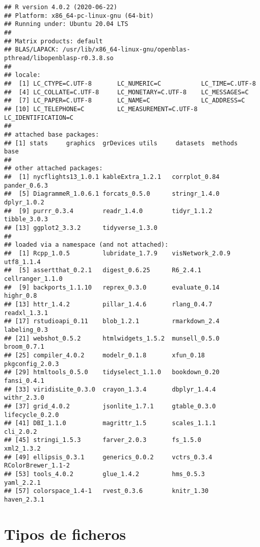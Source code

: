 \documentclass[
]{book}
\begin{document}
\begin{verbatim}
## R version 4.0.2 (2020-06-22)
## Platform: x86_64-pc-linux-gnu (64-bit)
## Running under: Ubuntu 20.04 LTS
## 
## Matrix products: default
## BLAS/LAPACK: /usr/lib/x86_64-linux-gnu/openblas-pthread/libopenblasp-r0.3.8.so
## 
## locale:
##  [1] LC_CTYPE=C.UTF-8       LC_NUMERIC=C           LC_TIME=C.UTF-8       
##  [4] LC_COLLATE=C.UTF-8     LC_MONETARY=C.UTF-8    LC_MESSAGES=C         
##  [7] LC_PAPER=C.UTF-8       LC_NAME=C              LC_ADDRESS=C          
## [10] LC_TELEPHONE=C         LC_MEASUREMENT=C.UTF-8 LC_IDENTIFICATION=C   
## 
## attached base packages:
## [1] stats     graphics  grDevices utils     datasets  methods   base     
## 
## other attached packages:
##  [1] nycflights13_1.0.1 kableExtra_1.2.1   corrplot_0.84      pander_0.6.3      
##  [5] DiagrammeR_1.0.6.1 forcats_0.5.0      stringr_1.4.0      dplyr_1.0.2       
##  [9] purrr_0.3.4        readr_1.4.0        tidyr_1.1.2        tibble_3.0.3      
## [13] ggplot2_3.3.2      tidyverse_1.3.0   
## 
## loaded via a namespace (and not attached):
##  [1] Rcpp_1.0.5         lubridate_1.7.9    visNetwork_2.0.9   utf8_1.1.4        
##  [5] assertthat_0.2.1   digest_0.6.25      R6_2.4.1           cellranger_1.1.0  
##  [9] backports_1.1.10   reprex_0.3.0       evaluate_0.14      highr_0.8         
## [13] httr_1.4.2         pillar_1.4.6       rlang_0.4.7        readxl_1.3.1      
## [17] rstudioapi_0.11    blob_1.2.1         rmarkdown_2.4      labeling_0.3      
## [21] webshot_0.5.2      htmlwidgets_1.5.2  munsell_0.5.0      broom_0.7.1       
## [25] compiler_4.0.2     modelr_0.1.8       xfun_0.18          pkgconfig_2.0.3   
## [29] htmltools_0.5.0    tidyselect_1.1.0   bookdown_0.20      fansi_0.4.1       
## [33] viridisLite_0.3.0  crayon_1.3.4       dbplyr_1.4.4       withr_2.3.0       
## [37] grid_4.0.2         jsonlite_1.7.1     gtable_0.3.0       lifecycle_0.2.0   
## [41] DBI_1.1.0          magrittr_1.5       scales_1.1.1       cli_2.0.2         
## [45] stringi_1.5.3      farver_2.0.3       fs_1.5.0           xml2_1.3.2        
## [49] ellipsis_0.3.1     generics_0.0.2     vctrs_0.3.4        RColorBrewer_1.1-2
## [53] tools_4.0.2        glue_1.4.2         hms_0.5.3          yaml_2.2.1        
## [57] colorspace_1.4-1   rvest_0.3.6        knitr_1.30         haven_2.3.1
\end{verbatim}

\hypertarget{tipos-de-ficheros}{%
\section{Tipos de ficheros}\label{tipos-de-ficheros}}
\end{document}
